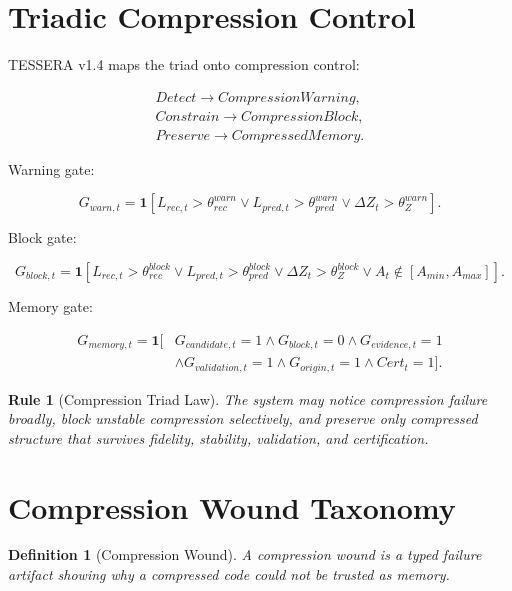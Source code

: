 \documentclass[12pt]{article}
\newtheorem{definition}{Definition}
\newtheorem{rulebox}{Rule}
\begin{document}
\section{Triadic Compression Control}

TESSERA v1.4 maps the triad onto compression control:

\[
\boxed{\begin{gathered}
Detect\rightarrow CompressionWarning,\\
Constrain\rightarrow CompressionBlock,\\
Preserve\rightarrow CompressedMemory.
\end{gathered}}
\]

Warning gate:

\[
G_{warn,t}=\mathbf{1}
\left[
L_{rec,t}>\theta_{rec}^{warn}
\vee
L_{pred,t}>\theta_{pred}^{warn}
\vee
\Delta Z_t>\theta_Z^{warn}
\right].
\]

Block gate:

\[
G_{block,t}=\mathbf{1}
\left[
L_{rec,t}>\theta_{rec}^{block}
\vee
L_{pred,t}>\theta_{pred}^{block}
\vee
\Delta Z_t>\theta_Z^{block}
\vee
A_t\notin[A_{min},A_{max}]
\right].
\]

Memory gate:

\[
\boxed{\begin{aligned}
G_{memory,t}=\mathbf{1}[&G_{candidate,t}=1 \wedge G_{block,t}=0 \wedge G_{evidence,t}=1\\
&\wedge G_{validation,t}=1 \wedge G_{origin,t}=1 \wedge Cert_t=1].
\end{aligned}}
\]

\begin{rulebox}[Compression Triad Law]
The system may notice compression failure broadly, block unstable compression
selectively, and preserve only compressed structure that survives fidelity,
stability, validation, and certification.
\end{rulebox}

\section{Compression Wound Taxonomy}

\begin{definition}[Compression Wound]
A compression wound is a typed failure artifact showing why a compressed code
could not be trusted as memory.
\end{definition}
\end{document}
